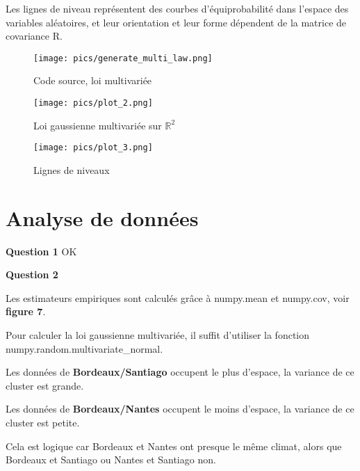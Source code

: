 \documentclass{article}
\begin{document}
\vspace{2\baselineskip}

Les lignes de niveau représentent des courbes d'équiprobabilité dans l'espace des variables aléatoires, et leur orientation et leur forme dépendent de la matrice de covariance R.


\vspace{2\baselineskip}

\begin{figure}[h]
	\begin{minipage}[t]{0.30\textwidth}
		\centering
		\texttt{[image: pics/generate\_multi\_law.png]}
		\caption{Code source, loi multivariée}
	\end{minipage}
	\hfill
	\begin{minipage}[t]{0.30\textwidth}
		\centering
		\texttt{[image: pics/plot\_2.png]}
		\caption{Loi gaussienne multivariée sur $\mathbb{R}^2$}
	\end{minipage}
	\hfill
	\begin{minipage}[t]{0.30\textwidth}
		\centering
		\texttt{[image: pics/plot\_3.png]}
		\caption{Lignes de niveaux}
	\end{minipage}
\end{figure}

\newpage
\section{Analyse de données}
	\textbf{Question 1} OK

\vspace{2\baselineskip}

	\textbf{Question 2} 

\vspace{2\baselineskip}

Les estimateurs empiriques sont calculés grâce à numpy.mean et numpy.cov, voir \textbf{figure 7}.

Pour calculer la loi gaussienne multivariée, il suffit d'utiliser la fonction numpy.random.multivariate\_normal.

\vspace{2\baselineskip}

Les données de \textbf{Bordeaux/Santiago} occupent le plus d'espace, la variance de ce cluster est grande.

Les données de \textbf{Bordeaux/Nantes} occupent le moins d'espace, la variance de ce cluster est petite.

Cela est logique car Bordeaux et Nantes ont presque le même climat, alors que Bordeaux et Santiago ou Nantes et Santiago non.
\end{document}
